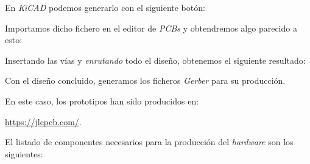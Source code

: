 \begin{itemize}
En \emph{KiCAD} podemos generarlo con el siguiente botón:


Importamos dicho fichero en el editor de \emph{PCBs} y obtendremos algo parecido a esto:


Insertando las vías y \emph{enrutando} todo el diseño, obtenemos el siguiente resultado:


\end{itemize}

Con el diseño concluido, generamos los ficheros \emph{Gerber} para su producción.

En este caso, los prototipos han sido producidos en:

\url{https://jlcpcb.com/}.

El listado de componentes necesarios para la producción del \emph{hardware} son los siguientes:


